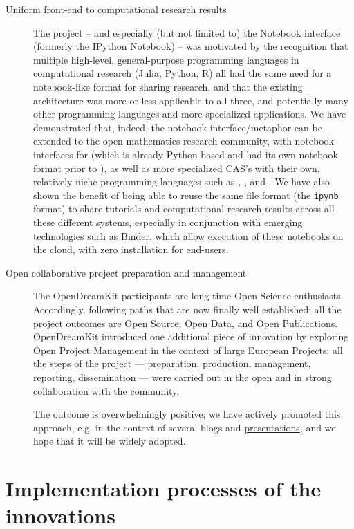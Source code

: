 \documentclass{deliverablereport}
\begin{document}
\begin{description}
  \smallskip
\item[Uniform front-end to computational research results] The \Jupyter
    project -- and especially (but not limited to) the \Jupyter Notebook
    interface (formerly the IPython Notebook) -- was motivated by
    the recognition that multiple high-level, general-purpose
    programming languages in computational research (Julia, Python, R) all
    had the same need for a notebook-like format for sharing research, and that
    the existing architecture was more-or-less applicable to all three, and
    potentially many other programming languages and more specialized applications.
    We have demonstrated that, indeed, the \Jupyter notebook interface/metaphor can
    be extended to the open mathematics research community, with notebook
    interfaces for \Sage (which is already Python-based and had its own notebook
    format prior to \Jupyter), as well as more specialized CAS's with their
    own, relatively niche programming languages such as \GAP, \Pari, and \Singular.
    We have also shown the benefit of being able to reuse the same file format
    (the \texttt{ipynb} format) to share tutorials and computational research
    results across all these different systems, especially in conjunction
    with emerging technologies such as Binder, which allow execution of
    these notebooks on the cloud, with zero installation for end-users.

  \smallskip
\item[Open collaborative project preparation and management] The
  OpenDreamKit participants are long time Open Science enthusiasts.
  Accordingly, following paths that are now finally well
  established: all the project outcomes are Open Source, Open Data,
  and Open Publications. OpenDreamKit introduced one additional piece of
  innovation by exploring Open Project Management in the context of
  large European Projects: all the steps of the project ---
  preparation, production, management, reporting, dissemination ---
  were carried out in the open and in strong collaboration with the
  community.

  The outcome is overwhelmingly positive; we have actively promoted
  this approach, e.g. in the context of several blogs and
  \href{https://opendreamkit.org/2018/12/14/eu-proposal/}{presentations},
  and we hope that it will be widely adopted.
\end{description}


\section{Implementation processes of the innovations}
\end{document}
